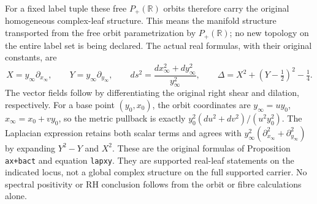 For a fixed label tuple these free $P_+(\mathbb R)$ orbits
therefore carry the original homogeneous complex-leaf structure.
This means the manifold structure transported from the free
orbit parametrization by $P_+(\mathbb R)$; no new topology on
the entire label set is being declared. The actual real formulas,
with their original constants, are
\begin{equation}\tag{SAP24}
X=y_\infty\partial_{x_\infty},\qquad
Y=y_\infty\partial_{y_\infty},\qquad
ds^2=\frac{dx_\infty^2+dy_\infty^2}{y_\infty^2},\qquad
\Delta=X^2+(Y-\tfrac12)^2-\tfrac14.
\end{equation}
The vector fields follow by differentiating the original right
shear and dilation, respectively. For a base point $(y_0,x_0)$,
the orbit coordinates are $y_\infty=u y_0$,
$x_\infty=x_0+v y_0$, so the metric pullback is exactly
$y_0^2(du^2+dv^2)/(u^2y_0^2)$. The Laplacian expression retains
both scalar terms and agrees with
$y_\infty^2(\partial_{x_\infty}^2+\partial_{y_\infty}^2)$ by
expanding $Y^2-Y$ and $X^2$. These are the original formulas
of Proposition \texttt{ax+bact} and equation \texttt{lapxy}.
They are supported real-leaf statements on the indicated locus,
not a global complex structure on the full supported carrier.
No spectral positivity or RH conclusion follows from the orbit
or fibre calculations alone.
